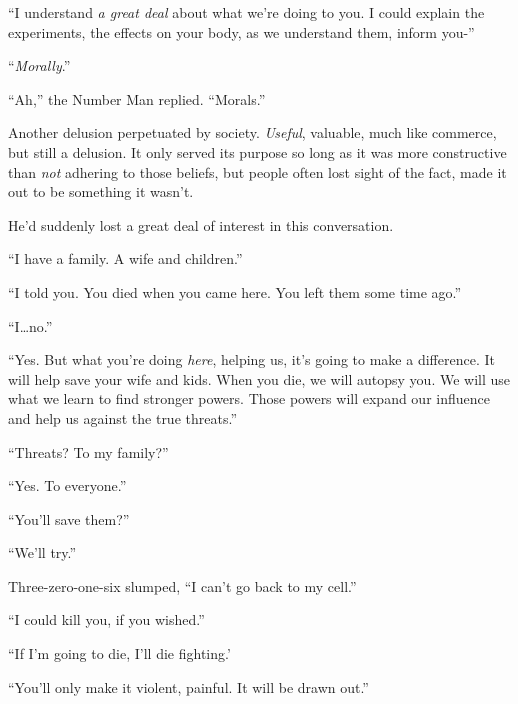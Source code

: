``I understand \emph{a great deal} about what we're doing to you.  I could explain the experiments, the effects on your body, as we understand them, inform you-''



``\emph{Morally}.''



``Ah,'' the Number Man replied.  ``Morals.''



Another delusion perpetuated by society.  \emph{Useful}, valuable, much like commerce, but still a delusion.  It only served its purpose so long as it was more constructive than \emph{not} adhering to those beliefs, but people often lost sight of the fact, made it out to be something it wasn't.



He'd suddenly lost a great deal of interest in this conversation.



``I have a family.  A wife and children.''



``I told you.  You died when you came here.  You left them some time ago.''



``I\ldots no.''



``Yes.  But what you're doing \emph{here}, helping us, it's going to make a difference.  It will help save your wife and kids.  When you die, we will autopsy you.  We will use what we learn to find stronger powers.  Those powers will expand our influence and help us against the true threats.''



``Threats?  To my family?''



``Yes.  To everyone.''



``You'll save them?''



``We'll try.''



Three-zero-one-six slumped, ``I can't go back to my cell.''



``I could kill you, if you wished.''



``If I'm going to die, I'll die fighting.'



``You'll only make it violent, painful.  It will be drawn out.''



